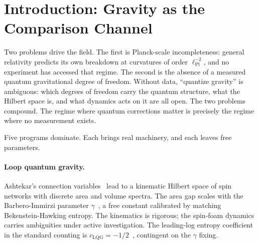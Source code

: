\documentclass[11pt,letterpaper]{article}
\theoremstyle{definition}
\newcommand{\J}{\mathrm{J}}
\newcommand{\phiG}{\varphi}
\newcommand{\Pl}{\mathrm{Pl}}
\begin{document}
\begin{abstract}
horizon-exponent density track $\rho_\Pl\,\phiG^{-588}$, the static
vacuum-fluid law $w=-1$, and a forced dynamic kernel
$w(z)=-1+\J(\phiG)/(1+z)$ whose observable present-day amplitude is
attenuated to $\phiG^{-4}\J(\phiG)\approx 0.017$.  The gravity sector
contains zero adjustable dimensionless parameters.  Every theorem-grade
claim in this paper is machine-checked in the accompanying open
formalization library, and the master statement assembling them is
audited clause by clause: fifteen clauses, none a placeholder, none
circular.  The boundary between theorem and target is stated exactly,
and the next decade's ringdown, entanglement, and dark-energy
measurements either hit the predicted numbers or kill the corresponding
sector.
\end{abstract}

\tableofcontents
\newpage

\section{Introduction: Gravity as the Comparison Channel}
\label{sec:intro}

Two problems drive the field.  The first is Planck-scale
incompleteness: general relativity predicts its own breakdown at
curvatures of order $\ell_\Pl^{-2}$, and no experiment has accessed
that regime.  The second is the absence of a measured quantum
gravitational degree of freedom.  Without data, ``quantize gravity'' is
ambiguous: which degrees of freedom carry the quantum structure, what
the Hilbert space is, and what dynamics acts on it are all open.  The
two problems compound.  The regime where quantum corrections matter is
precisely the regime where no measurement exists.

Five programs dominate.  Each brings real machinery, and each leaves
free parameters.

\paragraph{Loop quantum gravity.}
Ashtekar's connection variables~\cite{AshtekarLewandowski2004} lead to
a kinematic Hilbert space of spin networks with discrete area and
volume spectra.  The area gap scales with the Barbero-Immirzi parameter
$\gamma$~\cite{RovelliSmolin1995}, a free constant calibrated by
matching Bekenstein-Hawking entropy.  The kinematics is rigorous; the
spin-foam dynamics carries ambiguities under active investigation.  The
leading-log entropy coefficient in the standard counting is
$c_{\mathrm{LQG}}=-1/2$~\cite{KaulMajumdar2000}, contingent on the
$\gamma$ fixing.
\end{document}
